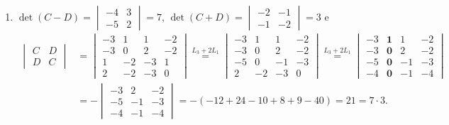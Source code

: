 \documentclass[12pt,a4paper]{article}
\begin{document}
\begin{enumerate}
\begin{enumerate}
\item 
$\det(C-D)=
\begin{vmatrix}
-4 & 3 \\
-5 & 2
\end{vmatrix}
= 7$, $\det(C+D)=
\begin{vmatrix}
-2 & -1 \\
-1 & -2
\end{vmatrix}
= 3$ e
\begin{align*}
\begin{vmatrix}
C & D \\
D & C
\end{vmatrix}
& =
\begin{vmatrix}
-3 &  1 &  1 & -2 \\
-3 &  0 &  2 & -2 \\
 1 & -2 & -3 &  1 \\
 2 & -2 & -3 &  0
\end{vmatrix}
\overset{ L_3 + 2L_1 }{=}
\begin{vmatrix}
-3 &  1 &  1 & -2 \\
-3 &  0 &  2 & -2 \\
-5 &  0 & -1 & -3 \\
 2 & -2 & -3 &  0
\end{vmatrix}
\overset{ L_3 + 2L_1 }{=}
\begin{vmatrix}
-3 & \textbf{1} &  1 & -2 \\
-3 & \textbf{0} &  2 & -2 \\
-5 & \textbf{0} & -1 & -3 \\
-4 & \textbf{0} & -1 & -4
\end{vmatrix}\\
& =-
\begin{vmatrix}
-3 &  2 & -2 \\
-5 & -1 & -3 \\
-4 & -1 & -4
\end{vmatrix}
= -(-12 + 24 -10 + 8 +9 -40)
= 21 = 7 \cdot 3.
\end{align*}
\end{enumerate}


\end{enumerate}
\end{document}
